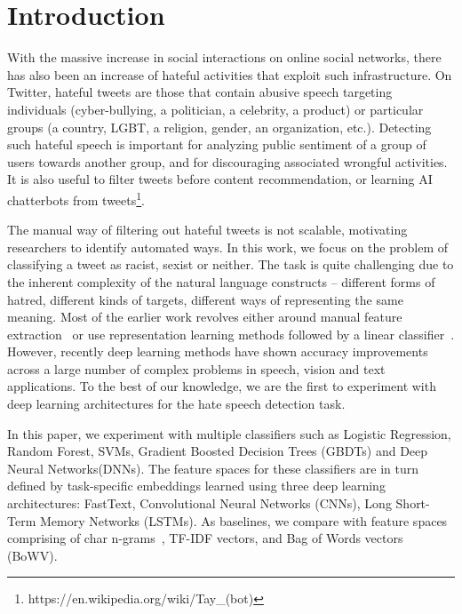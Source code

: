 \documentclass[letterpaper]{sig-alternate-2013}
\begin{document}


\section{Introduction}
With the massive increase in social interactions on online social networks, there has also been an increase of hateful activities that exploit such infrastructure. On Twitter, hateful tweets are those that contain abusive speech targeting individuals (cyber-bullying, a politician, a celebrity, a product) or particular groups (a country, LGBT, a religion, gender, an organization, etc.). Detecting such hateful speech is important for analyzing public sentiment of a group of users towards another group, and for discouraging associated wrongful activities. It is also useful to filter tweets before content recommendation, or learning AI chatterbots from tweets\footnote{https://en.wikipedia.org/wiki/Tay\_(bot)}. 

The manual way of filtering out hateful tweets is not scalable, motivating researchers to identify automated ways. In this work, we focus on the problem of classifying a tweet as racist, sexist or neither. The task is quite challenging due to the inherent complexity of the natural language constructs -- different forms of hatred, different kinds of targets, different ways of representing the same meaning. Most of the earlier work revolves either around manual feature extraction~\cite{waseem2016hateful} or use representation learning methods followed by a linear classifier~\cite{djuric2015hate, nobata2016abusive}. However, recently deep learning methods have shown accuracy improvements across a large number of complex problems in speech, vision and text applications. To the best of our knowledge, we are the first to experiment with deep learning architectures for the hate speech detection task.


In this paper, we experiment with multiple classifiers such as Logistic Regression, Random Forest, SVMs, Gradient Boosted Decision Trees (GBDTs) and Deep Neural Networks(DNNs). The feature spaces for these classifiers are in turn defined by task-specific embeddings learned using three deep learning architectures: FastText, Convolutional Neural Networks (CNNs), Long Short-Term Memory Networks (LSTMs). As baselines, we compare with feature spaces comprising of char n-grams~\cite{waseem2016hateful}, TF-IDF vectors, and Bag of Words vectors (BoWV).
\end{document}
